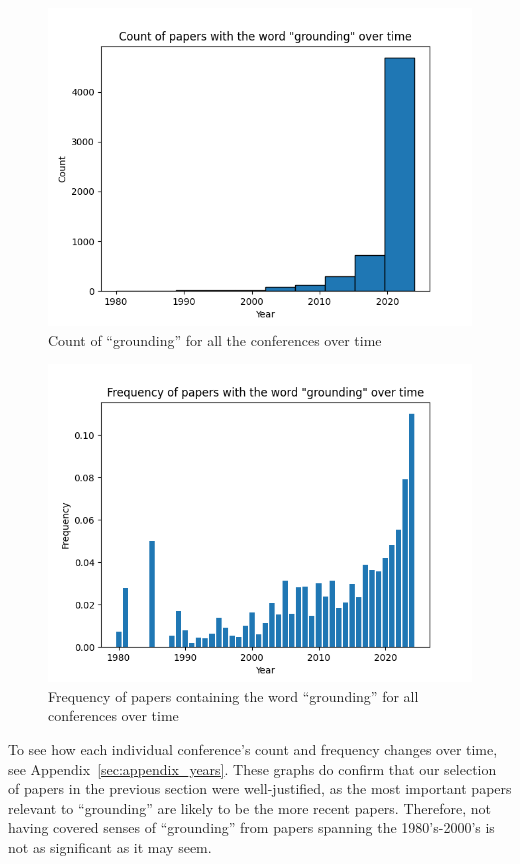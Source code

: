 \documentclass[11pt]{article}
\begin{document}
\begin{figure}[h]
  \includegraphics[width=\columnwidth]{figs/year_distribution/all_confs_grounding.png}
  \caption{Count of ``grounding'' for all the conferences over time}
  \label{fig:all_confs_count}
\end{figure}

\begin{figure}[h]
  \includegraphics[width=\columnwidth]{figs/year_distribution_freq/all_confs_grounding_dist.png}
  \caption{Frequency of papers containing the word ``grounding'' for all conferences over time}
  \label{fig:all_confs_freq}
\end{figure}

To see how each individual conference's count and frequency changes over time, see Appendix~\ref{sec:appendix_years}. These graphs do confirm that our selection of papers in the previous section were well-justified, as the most important papers relevant to ``grounding'' are likely to be the more recent papers. Therefore, not having covered senses of ``grounding'' from papers spanning the 1980's-2000's is not as significant as it may seem.
\end{document}

